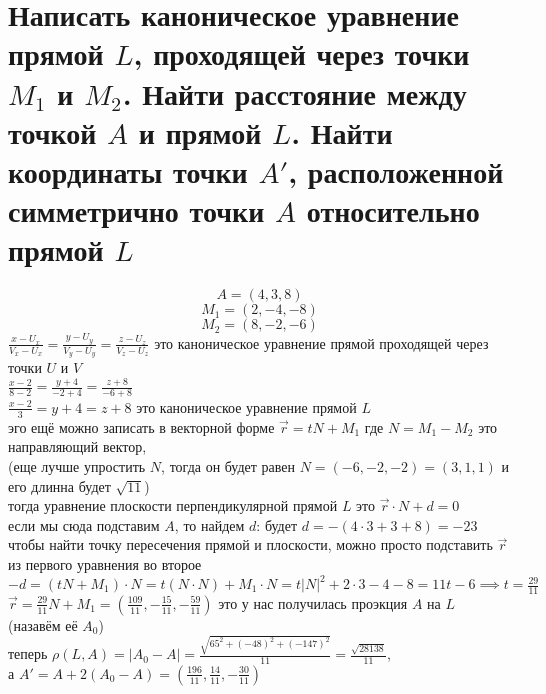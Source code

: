 \documentclass{article}
\renewcommand{\vec}{\overrightarrow}
\newcommand{\ds}{\displaystyle}
\newcommand{\abs}[1]{\left|#1\right|}
\begin{document}
  \section{Написать каноническое уравнение прямой $L$, проходящей через точки $M_1$ и $M_2$. Найти расстояние между точкой $A$ и прямой $L$. Найти координаты точки $A'$, расположенной симметрично точки $A$ относительно прямой $L$}
  $$ A = (4, 3, 8) $$
  $$ M_1 = (2, -4, -8) $$
  $$ M_2 = (8, -2, -6) $$
  $\ds \frac{x-U_x}{V_x-U_x} = \frac{y-U_y}{V_y-U_y} = \frac{z-U_z}{V_z-U_z}$ это каноническое уравнение прямой проходящей через точки $U$ и $V$ \\
  $\ds \frac{x-2}{8-2} = \frac{y+4}{-2+4} = \frac{z+8}{-6+8}$ \\
  $\ds \frac{x-2}{3} = y+4 = z+8$ это каноническое уравнение прямой $L$ \\
  эго ещё можно записать в векторной форме $\ds \vec{r} = tN + M_1$ где $N = M_1-M_2$ это направляющий вектор, \\
  (еще лучше упростить $N$, тогда он будет равен $N = (-6, -2, -2) = (3, 1, 1)$ и его длинна будет $\sqrt{11}$) \\
  тогда уравнение плоскости перпендикулярной прямой $L$ это $\ds \vec{r} \cdot N + d = 0$ \\
  если мы сюда подставим $A$, то найдем $d$: будет $d = -(4 \cdot 3 + 3 + 8) = -23$ \\
  чтобы найти точку пересечения прямой и плоскости, можно просто подставить $\vec{r}$ из первого уравнения во второе \\
  $\ds -d = (tN + M_1) \cdot N = t(N \cdot N) + M_1 \cdot N = t\abs{N}^2 + 2 \cdot 3 - 4 - 8 = 11t-6 \implies t = \frac{29}{11}$ \\
  $\ds \vec{r} = \frac{29}{11}N + M_1 = \left(\frac{109}{11}, -\frac{15}{11}, -\frac{59}{11}\right)$
  это у нас получилась проэкция $A$ на $L$ (назавём её $A_0$) \\
  теперь $\ds \rho(L,A) = \abs{A_0 - A} = \frac{\sqrt{65^2 + (-48)^2 + (-147)^2}}{11} = \frac{\sqrt{28138}}{11}$, \\
  а $\ds A' = A + 2(A_0 - A) = \left(\frac{196}{11}, \frac{14}{11}, - \frac{30}{11}\right)$
\end{document}
